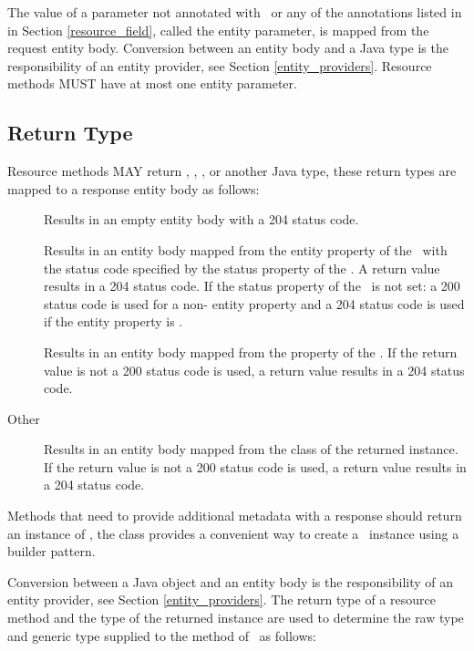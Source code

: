 The value of a parameter not annotated with \FormParam\ or any of the annotations listed in in Section \ref{resource_field}, called the entity parameter, is mapped from the request entity body. Conversion between an entity body and a Java type is the responsibility of an entity provider, see Section \ref{entity_providers}. Resource methods MUST have at most one entity parameter.

\subsection{Return Type}
\label{resource_method_return}

Resource methods MAY return , \Response, , or another Java type, these return types are mapped to a response entity body as follows:

\begin{description}
\item[] Results in an empty entity body with a 204 status code.
\item[\Response] Results in an entity body mapped from the entity property of the \Response\ with the status code specified by the status property of the \Response. A  return value results in a 204 status code. If the status property of the \Response\ is not set: a 200 status code is used for a non- entity property and a 204 status code is used if the entity property is .
\item[] Results in an entity body mapped from the  property of the . If the return value is not  a 200 status code is used, a  return value results in a 204 status code.
\item[Other] Results in an entity body mapped from the class of the returned instance. If the return value is not  a 200 status code is used, a  return value results in a 204 status code.
\end{description}

Methods that need to provide additional metadata with a response should return an instance of \Response, the \Response{} class provides a convenient way to create a \Response\ instance using a builder pattern.

Conversion between a Java object and an entity body is the responsibility of an entity provider, see Section \ref{entity_providers}. The return type of a resource method and the type of the returned instance are used to determine the raw type and generic type supplied to the  method of \MsgWrite\ as follows:

